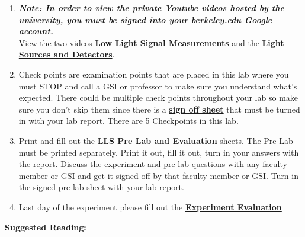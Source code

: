 \documentclass{../lab}
\begin{document}
\begin{enumerate}
    \item \emph{\textbf{Note: In order to view the private Youtube videos hosted by the university, you must be signed into your berkeley.edu Google account.}}\\
    View the two videos \href{http://youtu.be/X4XQ1jcMuoI}{\textbf{Low Light Signal Measurements}} and the \href{http://youtu.be/lQKLakISoBA}{\textbf{Light Sources and Detectors}}.

    \item Check points are examination points that are placed in this lab where you must STOP and call a GSI or professor to make sure you understand what's expected. There could  be multiple check points throughout your lab so make sure you don't skip them since there is a \href{http://experimentationlab.berkeley.edu/llscheckpoints}{\textbf{sign off sheet}} that must be turned in with your lab report. There are 5 Checkpoints in this lab.

    \item Print and fill out the \href{http://experimentationlab.berkeley.edu/LLSPreLab}{\textbf{LLS Pre Lab and Evaluation}} sheets. The Pre-Lab must be printed separately. Print it out, fill it out, turn in  your answers  with the report. Discuss the experiment and pre-lab questions with any faculty member or GSI and get it signed off by that faculty member or GSI. Turn in the signed pre-lab sheet with your lab report.

    \item Last day of the experiment please fill out the \href{\ExperimentEvaluation}{\textbf{Experiment Evaluation}}

\end{enumerate}

\noindent\textbf{Suggested Reading:}
\end{document}
